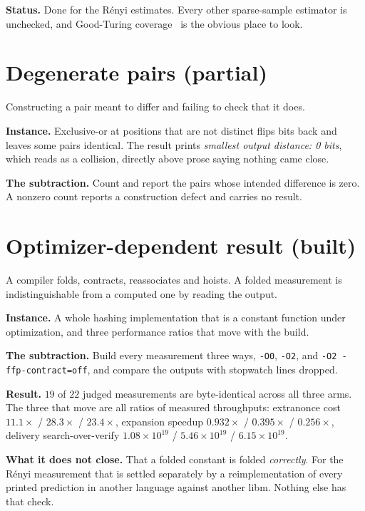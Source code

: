 \textbf{Status.} Done for the Rényi estimates. Every other sparse-sample estimator is unchecked, and Good-Turing coverage~\cite{src:Good-1953} is the obvious place to look.

\section{Degenerate pairs (partial)}

Constructing a pair meant to differ and failing to check that it does.

\textbf{Instance.} Exclusive-or at positions that are not distinct flips bits back and leaves some pairs identical. The result prints \emph{smallest output distance: 0 bits}, which reads as a collision, directly above prose saying nothing came close.

\textbf{The subtraction.} Count and report the pairs whose intended difference is zero. A nonzero count reports a construction defect and carries no result.

\section{Optimizer-dependent result (built)}

A compiler folds, contracts, reassociates and hoists. A folded measurement is indistinguishable from a computed one by reading the output.

\textbf{Instance.} A whole hashing implementation that is a constant function under optimization, and three performance ratios that move with the build.

\textbf{The subtraction.} Build every measurement three ways, \texttt{-O0}, \texttt{-O2}, and \texttt{-O2 -ffp-contract=off}, and compare the outputs with stopwatch lines dropped.

\textbf{Result.} \(19\) of \(22\) judged measurements are byte-identical across all three arms. The three that move are all ratios of measured throughputs: extranonce cost \(11.1\times\) / \(28.3\times\) / \(23.4\times\), expansion speedup \(0.932\times\) / \(0.395\times\) / \(0.256\times\), delivery search-over-verify \(1.08 \times 10^{19}\) / \(5.46 \times 10^{19}\) / \(6.15 \times 10^{19}\).

\textbf{What it does not close.} That a folded constant is folded \emph{correctly}. For the Rényi measurement that is settled separately by a reimplementation of every printed prediction in another language against another libm. Nothing else has that check.

